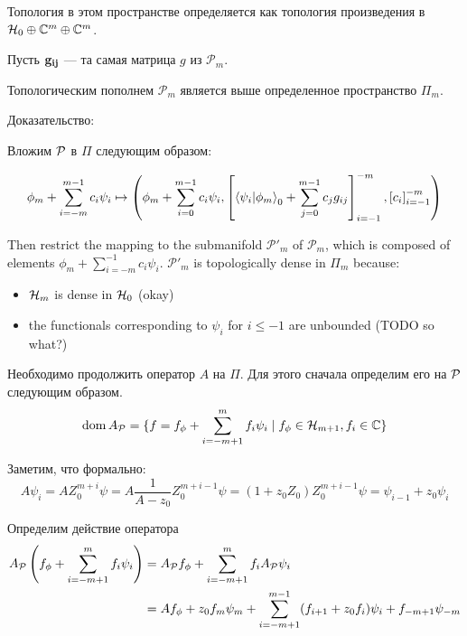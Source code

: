 Топология в этом пространстве определяется как топология произведения в $\mathcal{H}_{0} \oplus \mathbb{C}^m \oplus \mathbb{C}^m$.

Пусть $\vb{g_{ij}}$ — та самая матрица $g$ из $\mathcal{P}_m$. 

\begin{theorem}
Топологическим пополнем $\mathcal{P}_m$ является выше определенное пространство $\Pi_m$.
\end{theorem}

Доказательство:


Вложим $\mathcal{P}$ в $\Pi$ следующим образом:

\[
\phi_m + \sum\limits_{i = -m}^{m - 1} c_i \psi_i \mapsto
\left(
\phi_m + \sum\limits_{i = 0}^{m - 1} c_i \psi_i,
\left[ \ip{\psi_i}{\phi_m}_0 + \sum\limits_{j = 0}^{m - 1} c_j g_{ij} \right]_{i = -1}^{-m},
\left[ c_i \right]_{i = -1}^{-m}
\right)
\]

Then restrict the mapping to the submanifold $\mathcal{P}'_m$ of $\mathcal{P}_m$, which is composed of elements $\phi_m + \sum\limits_{i = - m}^{-1} c_i \psi_i$. $\mathcal{P}'_m$ is topologically dense in $\Pi_m$ because:

\begin{itemize}
\item $\mathcal{H}_{m}$ is dense in $\mathcal{H}_{0}$ (okay)
\item the functionals corresponding to $\psi_i$ for $i \le -1$ are unbounded (TODO so what?)
\end{itemize}




Необходимо продолжить оператор $A$ на $\Pi$. Для этого сначала определим его на $\mathcal{P}$ следующим образом.
\[
\operatorname{dom} A_{\mathcal{P}} = \{f = f_\phi + \sum\limits_{i = -m + 1}^{m} f_i \psi_i \mid f_\phi \in \mathcal{H}_{m + 1}, f_{i}\in \mathbb{C} \}
\]

Заметим, что формально:
\[
A \psi_i = A Z_0^{m + i} \psi = A \frac{1}{A - z_0} Z_0^{m + i - 1} \psi = (1 + z_0 Z_0) Z_0^{m + i - 1} \psi = \psi_{i - 1} + z_0 \psi_i
\]

Определим действие оператора 
\begin{align*}
A_{\mathcal{P}} \left( f_\phi + \sum\limits_{i = -m + 1}^{m} f_i \psi_i \right)
& = A_{\mathcal{P}} f_\phi + \sum\limits_{i = -m + 1}^{m} f_i A_{\mathcal{P}} \psi_i \\
& = A f_\phi + z_0 f_m \psi_m + \sum\limits_{i = -m + 1}^{m - 1} (f_{i + 1} + z_0 f_i) \psi_i + f_{-m + 1} \psi_{-m}
\end{align*}

